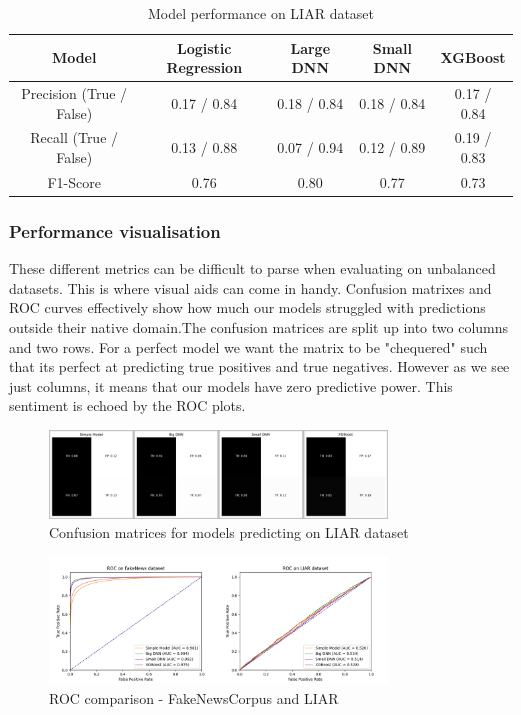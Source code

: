 \begin{table}[htpb]
  \centering
  \caption{Model performance on LIAR dataset}
  \label{tab:liarperformance}
  \begin{tabular}{c|cccc}
    Model & Logistic Regression & Large DNN & Small DNN & XGBoost \\ \hline
    Precision (True / False) & 0.17 / 0.84  & 0.18 / 0.84 & 0.18 / 0.84 & 0.17 / 0.84 \\ \hline
    Recall (True / False) & 0.13 / 0.88 & 0.07 / 0.94 & 0.12 / 0.89 & 0.19 / 0.83 \\ \hline
    F1-Score& 0.76 & 0.80 & 0.77 & 0.73 \\
  \end{tabular}
\end{table}

\subsubsection{Performance visualisation}
These different metrics can be difficult to parse when evaluating on unbalanced datasets. This is where visual aids can
come in handy. Confusion matrixes and ROC curves effectively show how much our models struggled with predictions outside
their native domain.The confusion matrices are split up into two columns and two rows. For a perfect model we want the
matrix to be "chequered" such that its perfect at predicting true positives and true negatives. However as we see just
columns, it means that our models have zero predictive power. This sentiment is echoed by the ROC plots.

\begin{figure}[htpb]
  \centering
  \includegraphics[width=0.8\textwidth]{figures/matrix_combined}
  \caption{Confusion matrices for  models predicting on LIAR dataset}
  \label{fig:conf_mat}
\end{figure}
\begin{figure}[htpb]
  \centering
  \includegraphics[width=0.8\textwidth]{figures/ROC_combined}
  \caption{ROC comparison - FakeNewsCorpus and LIAR}
  \label{fig:roc}
\end{figure}


